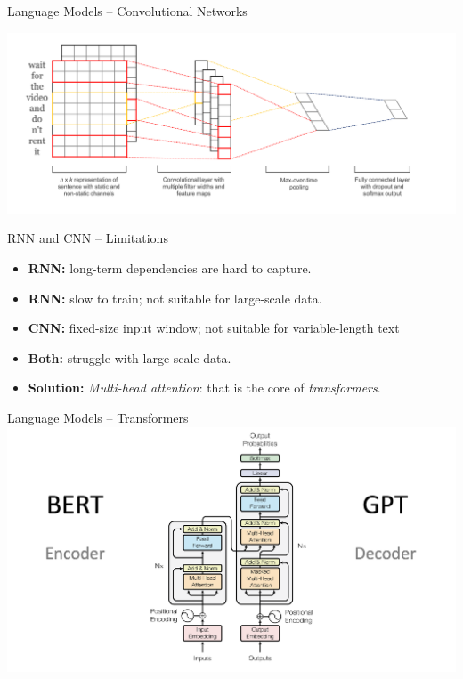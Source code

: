 \documentclass[presentation, 10pt]{beamer}\mode<presentation>{\usetheme{AMSBolognaFC}}
\begin{document}
\begin{frame}{Language Models -- Convolutional Networks}

\includegraphics[width=\textwidth]{img/cnn-text.png}

\end{frame}

\begin{frame}{RNN and CNN -- Limitations}
\begin{itemize}
	\item \textbf{RNN:} long-term dependencies are hard to capture.
	\item \textbf{RNN:} slow to train; not suitable for large-scale data.
	\item \textbf{CNN:} fixed-size input window; not suitable for variable-length text
	\item \textbf{Both:} struggle with large-scale data.
	\item \textbf{Solution:} \emph{Multi-head attention}: that is the core of \emph{transformers}.
\end{itemize}
\end{frame}
\begin{frame}{Language Models -- Transformers~\cite{DBLP:conf/nips/VaswaniSPUJGKP17}}
\includegraphics[width=\textwidth]{img/transformers.png}
\end{frame}
\end{document}
